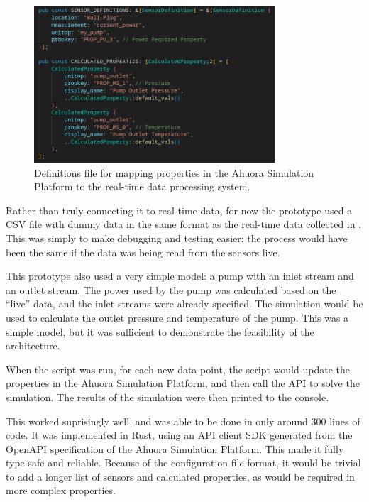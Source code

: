 \begin{figure}
    \centering
    \includegraphics[width=0.8\textwidth]{live_constants.png}
    \caption{Definitions file for mapping properties in the Ahuora Simulation Platform to the real-time data processing system.}
    \label{fig:live-constants}
\end{figure}

Rather than truly connecting it to real-time data, for now the prototype used a CSV file with dummy data in the same format as the real-time data collected in . 
This was simply to make debugging and testing easier; the process would have been the same if the data was being read from the sensors live.

This prototype also used a very simple model: a pump with an inlet stream and an outlet stream. 
The power used by the pump was calculated based on the  ``live'' data, and the inlet streams were already specified. 
The simulation would be used to calculate the outlet pressure and temperature of the pump. This was a simple model, but it was sufficient to demonstrate the feasibility of the architecture.


When the script was run, for each new data point, the script would update the properties in the Ahuora Simulation Platform, and then call the API to solve the simulation. The results of the simulation were then printed to the console. 

This worked suprisingly well, and was able to be done in only around 300 lines of code. 
It was implemented in Rust, using an API client SDK generated from the OpenAPI specification of the Ahuora Simulation Platform. 
This made it fully type-safe and reliable. 
Because of the configuration file format, it would be trivial to add a longer list of sensors and calculated properties, as would be required in more complex properties.

